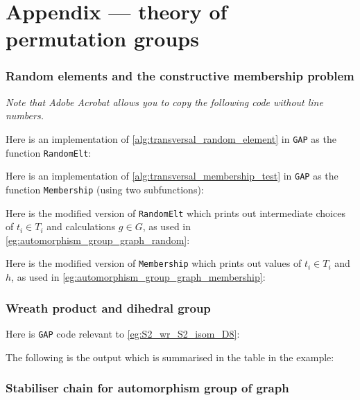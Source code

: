 \chapter{Appendix --- theory of permutation groups}%

\subsection{Random elements and the constructive membership problem}

\textit{Note that Adobe Acrobat allows you to copy the following code without line numbers.}

Here is an implementation of \autoref{alg:transversal_random_element} in \texttt{GAP} as the function \texttt{RandomElt}:\label{app:transversal_random_element}



Here is an implementation of \autoref{alg:transversal_membership_test} in \texttt{GAP} as the function \texttt{Membership} (using two subfunctions):\label{app:transversal_membership_test}



Here is the modified version of \texttt{RandomElt} which prints out intermediate choices of $t_i \in T_i$ and calculations $g \in G$, as used in \autoref{eg:automorphism_group_graph_random}:



Here is the modified version of \texttt{Membership} which prints out values of $t_i \in T_i$ and $h$, as used in \autoref{eg:automorphism_group_graph_membership}:



\subsection{Wreath product and dihedral group}

Here is \texttt{GAP} code relevant to \autoref{eg:S2_wr_S2_isom_D8}:



The following is the output which is summarised in the table in the example:



\subsection{Stabiliser chain for automorphism group of graph}


